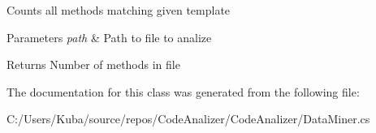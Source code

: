 Counts all methods matching given template 


\begin{DoxyParams}{Parameters}
{\em path} & Path to file to analize\\
\hline
\end{DoxyParams}
\begin{DoxyReturn}{Returns}
Number of methods in file
\end{DoxyReturn}


The documentation for this class was generated from the following file\+:\begin{DoxyCompactItemize}
\item 
C\+:/\+Users/\+Kuba/source/repos/\+Code\+Analizer/\+Code\+Analizer/Data\+Miner.\+cs\end{DoxyCompactItemize}

